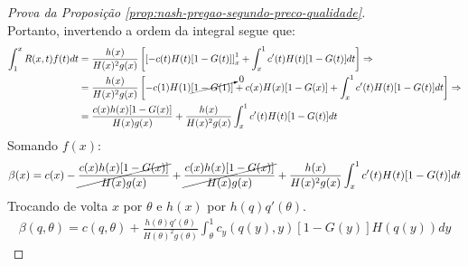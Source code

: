 \begin{proof}[Prova da Proposição \ref{prop:nash-pregao-segundo-preco-qualidade}]
\begin{equation*}
	\end{equation*}
	Portanto, invertendo a ordem da integral segue que:
	\begin{align*}
		\int_1^x R(x,t)f(t)dt & = \frac{h(x)}{H(x)^2g(x)} \left[ \left[ -c(t)H(t)[1-G(t)] \right]_x^1  + \int_x^1  c'(t)H(t)[1-G(t)] dt \right] \Rightarrow \\
		& = \frac{h(x)}{H(x)^2g(x)} \left[ -c(1)H(1)\cancelto{0}{[1-G(1)]} + c(x)H(x)[1-G(x)] + \int_x^1  c'(t)H(t)[1-G(t)] dt \right] \Rightarrow \\
		& = \frac{c(x)h(x)[1-G(x)]}{H(x)g(x)} + \frac{h(x)}{H(x)^2g(x)} \int_x^1  c'(t)H(t)[1-G(t)] dt
	\end{align*}
	Somando $f(x)$:
	\begin{align*}
		\beta(x) = c(x) - \cancel{\frac{c(x)h(x)[1-G(x)]}{H(x)g(x)}} + \cancel{\frac{c(x)h(x)[1-G(x)]}{H(x)g(x)}} + \frac{h(x)}{H(x)^2g(x)} \int_x^1  c'(t)H(t)[1-G(t)] dt
	\end{align*}
	Trocando de volta $x$ por $\theta$ e $h(x)$ por $h(q)q'(\theta)$.
	\begin{align*}
		\beta(q, \theta) = c(q, \theta) + \frac{h(\theta)q'(\theta)}{H(\theta)^2g(\theta)} \int_{\theta}^1 c_y(q(y), y)[1-G(y)]H(q(y))dy
	\end{align*}
\end{proof}